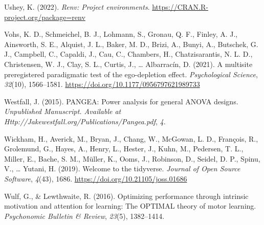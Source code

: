 \documentclass[
  man, donotrepeattitle,mask,floatsintext]{apa7}
\newlength{\cslhangindent}
\newlength{\cslentryspacingunit} %
\newenvironment{CSLReferences}[2] %
 {%
  \setlength{\parindent}{0pt}
  \ifodd #1
  \let\oldpar\par
  \def\par{\hangindent=\cslhangindent\oldpar}
  \fi
  \setlength{\parskip}{#2\cslentryspacingunit}
 }%
 {}
\begin{document}
\begin{CSLReferences}{1}{0}
\leavevmode{}%
Ushey, K. (2022). \emph{Renv: Project environments}. \url{https://CRAN.R-project.org/package=renv}

\leavevmode{}%
Vohs, K. D., Schmeichel, B. J., Lohmann, S., Gronau, Q. F., Finley, A. J., Ainsworth, S. E., Alquist, J. L., Baker, M. D., Brizi, A., Bunyi, A., Butschek, G. J., Campbell, C., Capaldi, J., Cau, C., Chambers, H., Chatzisarantis, N. L. D., Christensen, W. J., Clay, S. L., Curtis, J., \ldots{} Albarracín, D. (2021). A multisite preregistered paradigmatic test of the ego-depletion effect. \emph{Psychological Science}, \emph{32}(10), 1566--1581. \url{https://doi.org/10.1177/0956797621989733}

\leavevmode{}%
Westfall, J. (2015). PANGEA: Power analysis for general ANOVA designs. \emph{Unpublished Manuscript. Available at Http://Jakewestfall.org/Publications/Pangea.pdf}, \emph{4}.

\leavevmode{}%
Wickham, H., Averick, M., Bryan, J., Chang, W., McGowan, L. D., François, R., Grolemund, G., Hayes, A., Henry, L., Hester, J., Kuhn, M., Pedersen, T. L., Miller, E., Bache, S. M., Müller, K., Ooms, J., Robinson, D., Seidel, D. P., Spinu, V., \ldots{} Yutani, H. (2019). Welcome to the {tidyverse}. \emph{Journal of Open Source Software}, \emph{4}(43), 1686. \url{https://doi.org/10.21105/joss.01686}

\leavevmode{}%
Wulf, G., \& Lewthwaite, R. (2016). Optimizing performance through intrinsic motivation and attention for learning: The OPTIMAL theory of motor learning. \emph{Psychonomic Bulletin \& Review}, \emph{23}(5), 1382--1414.

\end{CSLReferences}
\end{document}
